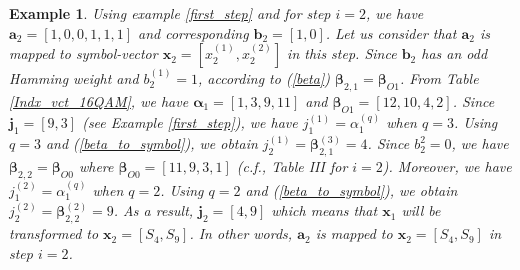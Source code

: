 \documentclass[12pt, draftclsnofoot, onecolumn]{IEEEtran}
\newcommand{\mb}[1]{\boldsymbol{#1}}
\newtheorem{example}{Example}
\begin{document}
\begin{example}
Using  example \ref{first_step} %
and for step $i=2$,  we have $\mb{a}_{2} = [1,0,0,1,1,1]$ and corresponding  $\mb{b}_{2} = [1,0]$.  Let us consider that $\mb{a}_{2}$ is mapped to  symbol-vector  $\mb{x}_{2} = [x_{2}^{(1)}, x_{2}^{(2)}]$  in this step.  %
  Since $\mb{b}_{2}$ has an odd Hamming weight and $b_{2}^{(1)} = 1$, according to (\ref{beta}) $\mb{\beta}_{2,1} = \mb{\beta}_{O1}$.
From Table \ref{Indx_vct_16QAM}, we have  $\mb{\alpha}_{1} = [1, 3, 9, 11]$ and $\mb{\beta}_{O1} = [12, 10, 4, 2]$. Since    $\mb{j}_{1}=[9,3]$ (see Example \ref{first_step}),  we have $j_{1}^{(1)} = \alpha_{1}^{(q)}$ when  $q = 3$.  Using $q=3$ and   (\ref{beta_to_symbol}),  we obtain
$j_{2}^{(1)} = \mb{\beta}_{2,1}^{(3)} = 4$.
 Since  $b_{2}^{2}=0$, we have $\mb{\beta}_{2,2} = \mb{\beta}_{O0}$ where  $\mb{\beta}_{O0} = [11, 9, 3, 1]$ (c.f.,  Table III for $i = 2$). Moreover,  we have $j_{1}^{(2)} = \alpha_{1}^{(q)}$ when $q=2$.  Using $q=2$ and   (\ref{beta_to_symbol}), we obtain   
$j_{2}^{(2)}
= \mb{\beta}_{2,2}^{(2)} = 9$.
 As a result, $\mb{j}_{2} = [4,9]$ which means that  $\mb{x}_{1}$  will  be transformed to $\mb{x}_{2} = [S_{4}, S_{9}]$. In other words, $\mb{a}_{2}$ is mapped to $\mb{x}_{2} = [S_{4}, S_{9}]$ in step $i=2$.
 



\end{example}
\end{document}
